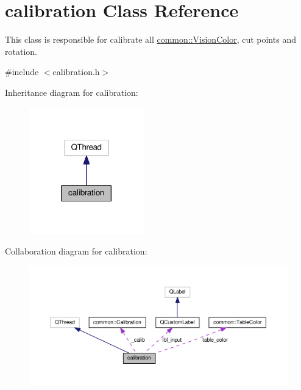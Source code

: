 \hypertarget{classcalibration}{}\section{calibration Class Reference}
\label{classcalibration}


This class is responsible for calibrate all \hyperlink{structcommon_1_1VisionColor}{common\+::\+Vision\+Color}, cut points and rotation.  




{\ttfamily \#include $<$calibration.\+h$>$}



Inheritance diagram for calibration\+:\nopagebreak
\begin{figure}[H]
\begin{center}
\leavevmode
\includegraphics[width=141pt]{classcalibration__inherit__graph}
\end{center}
\end{figure}


Collaboration diagram for calibration\+:\nopagebreak
\begin{figure}[H]
\begin{center}
\leavevmode
\includegraphics[width=350pt]{classcalibration__coll__graph}
\end{center}
\end{figure}
